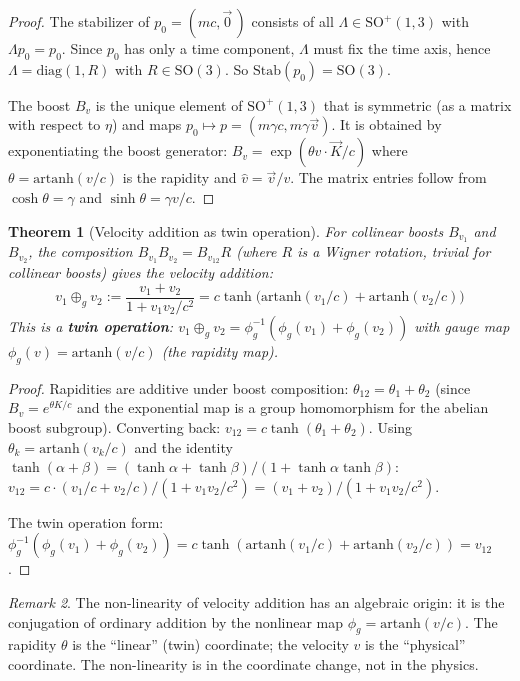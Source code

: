 \documentclass[12pt]{article}
\theoremstyle{plain}
\newtheorem{theorem}{Theorem}[section]
\theoremstyle{definition}
\theoremstyle{remark}
\newtheorem{remark}[theorem]{Remark}
\newcommand{\Stab}{\mathrm{Stab}}
\newcommand{\SO}{\mathrm{SO}}
\begin{document}
\begin{proof}
The stabilizer of $p_0 = (mc, \vec{0}\,)$ consists of all $\Lambda \in \SO^+(1,3)$ with $\Lambda p_0 = p_0$. Since $p_0$ has only a time component, $\Lambda$ must fix the time axis, hence $\Lambda = \mathrm{diag}(1, R)$ with $R \in \SO(3)$. So $\Stab(p_0) = \SO(3)$.

The boost $B_v$ is the unique element of $\SO^+(1,3)$ that is symmetric (as a matrix with respect to $\eta$) and maps $p_0 \mapsto p = (m\gamma c, m\gamma\vec{v})$. It is obtained by exponentiating the boost generator: $B_v = \exp(\theta\hat{v}\cdot\vec{K}/c)$ where $\theta = \mathrm{artanh}(v/c)$ is the rapidity and $\hat{v} = \vec{v}/v$. The matrix entries follow from $\cosh\theta = \gamma$ and $\sinh\theta = \gamma v/c$.
\end{proof}

\begin{theorem}[Velocity addition as twin operation]\label{thm:twin-addition}
For collinear boosts $B_{v_1}$ and $B_{v_2}$, the composition $B_{v_1} B_{v_2} = B_{v_{12}} R$ (where $R$ is a Wigner rotation, trivial for collinear boosts) gives the velocity addition:
\begin{equation}\label{eq:twin-add}
\boxed{v_1 \oplus_g v_2 := \frac{v_1 + v_2}{1 + v_1v_2/c^2} = c\tanh\!\big(\mathrm{artanh}(v_1/c) + \mathrm{artanh}(v_2/c)\big)}
\end{equation}
This is a \textbf{twin operation}: $v_1 \oplus_g v_2 = \phi_g^{-1}(\phi_g(v_1) + \phi_g(v_2))$ with gauge map $\phi_g(v) = \mathrm{artanh}(v/c)$ (the rapidity map).
\end{theorem}

\begin{proof}
Rapidities are additive under boost composition: $\theta_{12} = \theta_1 + \theta_2$ (since $B_v = e^{\theta K/c}$ and the exponential map is a group homomorphism for the abelian boost subgroup). Converting back: $v_{12} = c\tanh(\theta_1 + \theta_2)$. Using $\theta_k = \mathrm{artanh}(v_k/c)$ and the identity $\tanh(\alpha + \beta) = (\tanh\alpha + \tanh\beta)/(1 + \tanh\alpha\tanh\beta)$:
$v_{12} = c \cdot (v_1/c + v_2/c)/(1 + v_1v_2/c^2) = (v_1+v_2)/(1+v_1v_2/c^2)$.

The twin operation form: $\phi_g^{-1}(\phi_g(v_1) + \phi_g(v_2)) = c\tanh(\mathrm{artanh}(v_1/c) + \mathrm{artanh}(v_2/c)) = v_{12}$.
\end{proof}

\begin{remark}\label{rmk:nonlinearity}
The non-linearity of velocity addition has an algebraic origin: it is the conjugation of ordinary addition by the nonlinear map $\phi_g = \mathrm{artanh}(v/c)$. The rapidity $\theta$ is the ``linear'' (twin) coordinate; the velocity $v$ is the ``physical'' coordinate. The non-linearity is in the coordinate change, not in the physics.
\end{remark}
\end{document}
